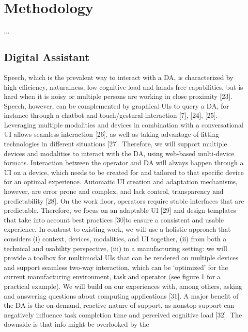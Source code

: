 \section{Methodology}\label{sec:Methodology}

...

\subsection{Digital Assistant}\label{sec:DA}

Speech, which is the prevalent way to interact with a DA, is characterized by high efficiency, naturalness, low
cognitive load and hands-free capabilities, but is hard when it is noisy or multiple persons are working in close
proximity [23]. Speech, however, can be complemented by graphical UIs to query a DA, for instance through a
chatbot and touch/gestural interaction [7], [24], [25]. Leveraging multiple modalities and devices in combination with
a conversational UI allows seamless interaction [26], as well as taking advantage of fitting technologies in different
situations [27]. Therefore, we will support multiple devices and modalities to interact with the DA, using web-based
multi-device formats. Interaction between the operator and DA will always happen through a UI on a device, which
needs to be created for and tailored to that specific device for an optimal experience. Automatic UI creation and
adaptation mechanisms, however, are error prone and complex, and lack control, transparency and predictability
[28]. On the work floor, operators require stable interfaces that are predictable. Therefore, we focus on an adaptable
UI [29] and design templates that take into account best practices [30]to ensure a consistent and usable experience.
In contrast to existing work, we will use a holistic approach that considers (i) context, devices, modalities, and UI
together, (ii) from both a technical and usability perspective, (iii) in a manufacturing setting: we will provide a toolbox
for multimodal UIs that can be rendered on multiple devices and support seamless two-way interaction, which can
be ‘optimized’ for the current manufacturing environment, task and operator (see figure 1 for a practical example).
We will build on our experiences with, among others, asking and answering questions about computing applications
[31].
A major benefit of the DA is the on-demand, reactive nature of support, as nonstop support can negatively influence
task completion time and perceived cognitive load [32]. The downside is that info might be overlooked by the
